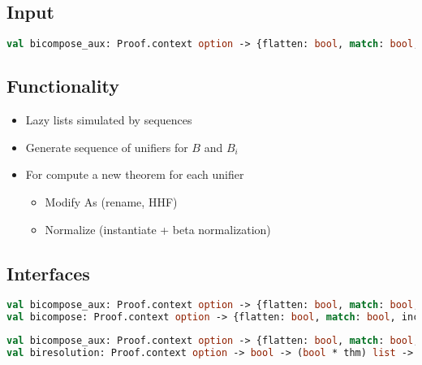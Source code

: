 \subsection{Input}
\begin{frame}[fragile]
\begin{lstlisting}[basicstyle=\ttfamily,keywordstyle=\color{blue},language=ML,breaklines=true]
val bicompose_aux: Proof.context option -> {flatten: bool, match: bool, incremented: bool} -> thm * ((term * term) list * term list * term * term) * bool -> bool * thm * int -> thm Seq.seq
\end{lstlisting}
\end{frame}

\subsection{Functionality}
\begin{frame}
  \begin{itemize}[<+->]
  	\item Lazy lists simulated by sequences
    \item Generate sequence of unifiers for $B$ and $B_i$
    \item For compute a new theorem for each unifier
        \begin{itemize}[<+->]
            \item Modify As (rename, HHF)
            \item Normalize (instantiate + beta normalization)
        \end{itemize}
  \end{itemize}
\end{frame}

\subsection{Interfaces}
\begin{frame}[fragile]
\begin{lstlisting}[basicstyle=\ttfamily,keywordstyle=\color{blue},language=ML,breaklines=true]
val bicompose_aux: Proof.context option -> {flatten: bool, match: bool, incremented: bool} -> thm * ((term * term) list * term list * term * term) * bool -> bool * thm * int -> thm Seq.seq
val bicompose: Proof.context option -> {flatten: bool, match: bool, incremented: bool} -> bool * thm * int -> int -> thm -> thm Seq.seq
\end{lstlisting}
\end{frame}
\begin{frame}[fragile]
\begin{lstlisting}[basicstyle=\ttfamily,keywordstyle=\color{blue},language=ML,breaklines=true]
val bicompose_aux: Proof.context option -> {flatten: bool, match: bool, incremented: bool} -> thm * ((term * term) list * term list * term * term) * bool -> bool * thm * int -> thm Seq.seq
val biresolution: Proof.context option -> bool -> (bool * thm) list -> int -> thm -> thm Seq.seq
\end{lstlisting}
\end{frame}
